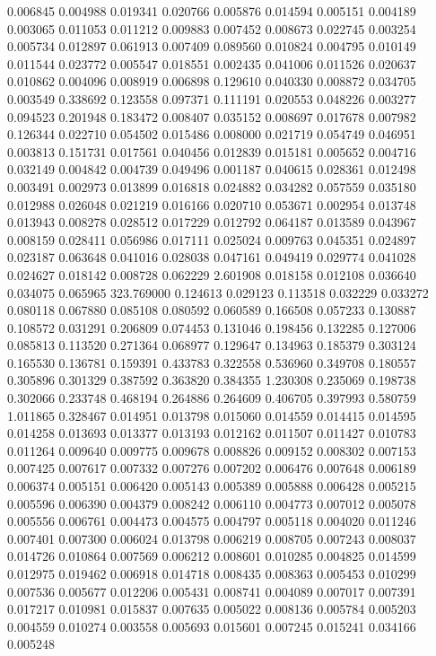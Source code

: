 0.006845
0.004988
0.019341
0.020766
0.005876
0.014594
0.005151
0.004189
0.003065
0.011053
0.011212
0.009883
0.007452
0.008673
0.022745
0.003254
0.005734
0.012897
0.061913
0.007409
0.089560
0.010824
0.004795
0.010149
0.011544
0.023772
0.005547
0.018551
0.002435
0.041006
0.011526
0.020637
0.010862
0.004096
0.008919
0.006898
0.129610
0.040330
0.008872
0.034705
0.003549
0.338692
0.123558
0.097371
0.111191
0.020553
0.048226
0.003277
0.094523
0.201948
0.183472
0.008407
0.035152
0.008697
0.017678
0.007982
0.126344
0.022710
0.054502
0.015486
0.008000
0.021719
0.054749
0.046951
0.003813
0.151731
0.017561
0.040456
0.012839
0.015181
0.005652
0.004716
0.032149
0.004842
0.004739
0.049496
0.001187
0.040615
0.028361
0.012498
0.003491
0.002973
0.013899
0.016818
0.024882
0.034282
0.057559
0.035180
0.012988
0.026048
0.021219
0.016166
0.020710
0.053671
0.002954
0.013748
0.013943
0.008278
0.028512
0.017229
0.012792
0.064187
0.013589
0.043967
0.008159
0.028411
0.056986
0.017111
0.025024
0.009763
0.045351
0.024897
0.023187
0.063648
0.041016
0.028038
0.047161
0.049419
0.029774
0.041028
0.024627
0.018142
0.008728
0.062229
2.601908
0.018158
0.012108
0.036640
0.034075
0.065965
323.769000
0.124613
0.029123
0.113518
0.032229
0.033272
0.080118
0.067880
0.085108
0.080592
0.060589
0.166508
0.057233
0.130887
0.108572
0.031291
0.206809
0.074453
0.131046
0.198456
0.132285
0.127006
0.085813
0.113520
0.271364
0.068977
0.129647
0.134963
0.185379
0.303124
0.165530
0.136781
0.159391
0.433783
0.322558
0.536960
0.349708
0.180557
0.305896
0.301329
0.387592
0.363820
0.384355
1.230308
0.235069
0.198738
0.302066
0.233748
0.468194
0.264886
0.264609
0.406705
0.397993
0.580759
1.011865
0.328467
0.014951
0.013798
0.015060
0.014559
0.014415
0.014595
0.014258
0.013693
0.013377
0.013193
0.012162
0.011507
0.011427
0.010783
0.011264
0.009640
0.009775
0.009678
0.008826
0.009152
0.008302
0.007153
0.007425
0.007617
0.007332
0.007276
0.007202
0.006476
0.007648
0.006189
0.006374
0.005151
0.006420
0.005143
0.005389
0.005888
0.006428
0.005215
0.005596
0.006390
0.004379
0.008242
0.006110
0.004773
0.007012
0.005078
0.005556
0.006761
0.004473
0.004575
0.004797
0.005118
0.004020
0.011246
0.007401
0.007300
0.006024
0.013798
0.006219
0.008705
0.007243
0.008037
0.014726
0.010864
0.007569
0.006212
0.008601
0.010285
0.004825
0.014599
0.012975
0.019462
0.006918
0.014718
0.008435
0.008363
0.005453
0.010299
0.007536
0.005677
0.012206
0.005431
0.008741
0.004089
0.007017
0.007391
0.017217
0.010981
0.015837
0.007635
0.005022
0.008136
0.005784
0.005203
0.004559
0.010274
0.003558
0.005693
0.015601
0.007245
0.015241
0.034166
0.005248
